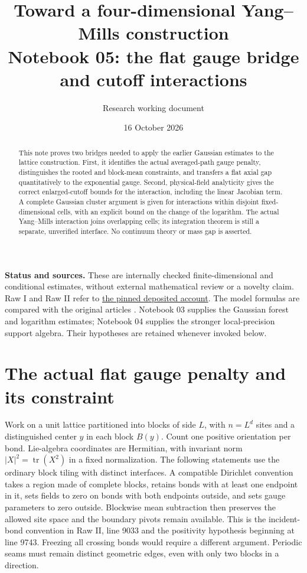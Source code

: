 \documentclass[11pt]{article}
\title{Toward a four-dimensional Yang--Mills construction\\
\large Notebook 05: the flat gauge bridge and cutoff interactions}
\author{Research working document}
\date{16 October 2026}
\theoremstyle{remark}
\newcommand{\tr}{\operatorname{tr}}
\begin{document}
\maketitle

\begin{abstract}
This note proves two bridges needed to apply the earlier Gaussian
estimates to the lattice construction. First, it identifies the actual
averaged-path gauge penalty, distinguishes the rooted and block-mean
constraints, and transfers a flat axial gap quantitatively to the
exponential gauge. Second, physical-field analyticity gives the correct
enlarged-cutoff bounds for the interaction, including the linear
Jacobian term. A complete Gaussian cluster argument is given for
interactions within disjoint fixed-dimensional cells, with an explicit
bound on the change of the logarithm. The actual Yang--Mills interaction
joins overlapping cells; its integration theorem is still a separate,
unverified interface. No continuum theory or mass gap is asserted.
\end{abstract}

\noindent\textbf{Status and sources.}
These are internally checked finite-dimensional and conditional
estimates, without external mathematical review or a novelty claim.
Raw I and Raw II refer to
\href{https://github.com/ethanwsussman/Yang--Mills-LLM-experiment/tree/e392ef45013a581664bab76b90867170b30fe10e}
{the pinned deposited account}.
The model formulas are compared with the original articles
\cite{balaban99,balaban109,balaban116}.
Notebook 03 supplies the Gaussian forest and logarithm estimates;
Notebook 04 supplies the stronger local-precision support algebra.
Their hypotheses are retained whenever invoked below.

\section{The actual flat gauge penalty and its constraint}

Work on a unit lattice partitioned into blocks of side $L$, with
$n=L^d$ sites and a distinguished center $y$ in each block $B(y)$.
Count one positive orientation per bond. Lie-algebra coordinates are
Hermitian, with invariant norm $|X|^2=\tr(X^2)$ in a fixed normalization.
The following statements use the ordinary block tiling with distinct
interfaces. A compatible Dirichlet convention takes a region made of
complete blocks, retains bonds with at least one endpoint in it, sets
fields to zero on bonds with both endpoints outside, and sets gauge
parameters to zero outside. Blockwise mean subtraction then preserves
the allowed site space and the boundary pivots remain available.
This is the incident-bond convention in Raw II, line 9033 and the
positivity hypothesis beginning at line 9743. Freezing all crossing
bonds would require a different argument. Periodic seams must remain
distinct geometric edges, even with only two blocks in a direction.
\end{document}
